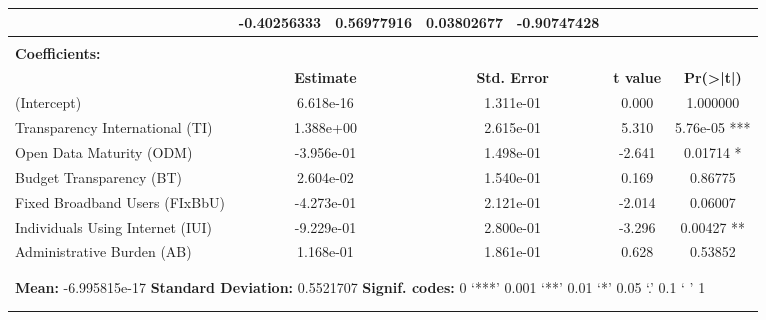 \documentclass[a4paper, twoside]{report}
\begin{document}
\begin{landscape}
\begin{table}[htbp]
\begin{adjustbox}{max width=\linewidth}
\begin{tabular}{lllllllllll}
          & \multicolumn{1}{c}{-0.40256333 } & \multicolumn{1}{c}{ 0.56977916} & \multicolumn{1}{c}{0.03802677} & \multicolumn{1}{c}{-0.90747428 } &       &       &       &       &       &  \\
    \midrule
    \multicolumn{10}{c}{}                                                         &  \\
    \midrule
    \multicolumn{11}{l}{\textbf{Coefficients:}} \\
          & \multicolumn{2}{c}{\textbf{Estimate}} & \multicolumn{2}{c}{\textbf{Std. Error}} & \multicolumn{2}{c}{\textbf{t value}} & \multicolumn{4}{c}{\textbf{Pr(>|t|)   }} \\
    (Intercept) & \multicolumn{2}{c}{6.618e-16} & \multicolumn{2}{c}{1.311e-01} & \multicolumn{2}{c}{ 0.000 } & \multicolumn{4}{c}{1.000000  } \\
    Transparency International  (TI) & \multicolumn{2}{c}{1.388e+00} & \multicolumn{2}{c}{2.615e-01} & \multicolumn{2}{c}{5.310} & \multicolumn{4}{c}{5.76e-05 ***} \\
    Open Data Maturity (ODM) & \multicolumn{2}{c}{-3.956e-01} & \multicolumn{2}{c}{ 1.498e-01} & \multicolumn{2}{c}{-2.641} & \multicolumn{4}{c}{0.01714 *} \\
    Budget Transparency (BT) & \multicolumn{2}{c}{ 2.604e-02} & \multicolumn{2}{c}{1.540e-01} & \multicolumn{2}{c}{  0.169  } & \multicolumn{4}{c}{0.86775  } \\
    Fixed Broadband Users (FIxBbU) & \multicolumn{2}{c}{-4.273e-01} & \multicolumn{2}{c}{2.121e-01} & \multicolumn{2}{c}{-2.014} & \multicolumn{4}{c}{0.06007 } \\
    Individuals Using Internet (IUI) & \multicolumn{2}{c}{-9.229e-01 } & \multicolumn{2}{c}{2.800e-01} & \multicolumn{2}{c}{-3.296} & \multicolumn{4}{c}{0.00427 ** } \\
    Administrative Burden (AB) & \multicolumn{2}{c}{1.168e-01  } & \multicolumn{2}{c}{1.861e-01} & \multicolumn{2}{c}{0.628} & \multicolumn{4}{c}{0.53852 } \\
    \multicolumn{11}{c}{} \\
    \midrule
    \multicolumn{11}{c}{} \\
    \midrule
    \multicolumn{11}{l}{\textbf{\hfill Mean:} -6.995815e-17 \hfill  \textbf{Standard Deviation:} 0.5521707  \hfill   \textbf{Signif. codes:}  0 ‘***’ 0.001 ‘**’ 0.01 ‘*’ 0.05 ‘.’ 0.1 ‘ ’ 1 \hfill} \\
    \midrule
    \multicolumn{11}{c}{} \\
    \midrule
    \multicolumn{11}{c}{} \\

\end{tabular}
\end{adjustbox}
\end{table}
\end{landscape}
\end{document}
